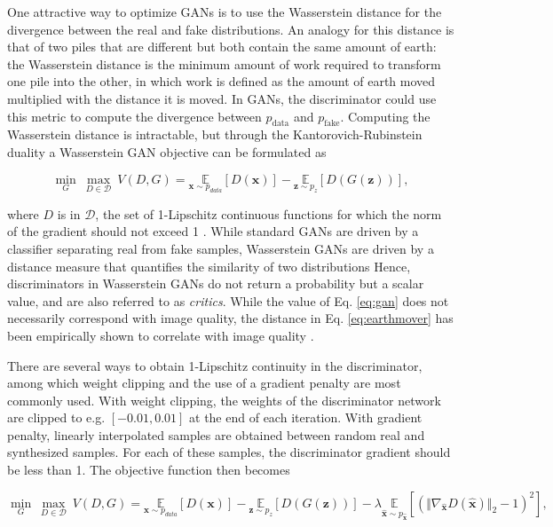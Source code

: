 \documentclass{article}
\begin{document}
One attractive way to optimize GANs is to use the Wasserstein distance for the divergence between the real and fake distributions. An analogy for this distance is that of two piles that are different but both contain the same amount of earth: the Wasserstein distance is the minimum amount of work required to transform one pile into the other, in which work is defined as the amount of earth moved multiplied with the distance it is moved. In GANs, the discriminator could use this metric to compute the divergence between $p_{\text{data}}$ and $p_{\text{fake}}$. Computing the Wasserstein distance is intractable, but through the Kantorovich-Rubinstein duality a Wasserstein GAN objective can be formulated \cite{Arjo17} as

\begin{equation}
\underset{G}{\min}~\underset{D \in \mathcal{D}}{\max}~ V(D,G)=\underset{\mathbf{x}\sim p_{data}}{\mathds{E}} [D(\mathbf{x})]-\underset{\mathbf{z}\sim p_z}{\mathds{E}} [D(G(\mathbf{z}))],
\label{eq:earthmover}
\end{equation}

where $D$ is in $\mathcal{D}$, the set of 1-Lipschitz continuous functions for which the norm of the gradient should not exceed 1 \cite{Arjo17}. While standard GANs are driven by a classifier separating real from fake samples, Wasserstein GANs are driven by a distance measure that quantifies the similarity of two distributions Hence, discriminators in Wasserstein GANs do not return a probability but a scalar value, and are also referred to as \textit{critics}.  While the value of Eq. \ref{eq:gan} does not necessarily correspond with image quality, the distance in Eq. \ref{eq:earthmover} has been empirically shown to correlate with image quality \cite{Arjo17}.

There are several ways to obtain 1-Lipschitz continuity in the discriminator, among which weight clipping \cite{Arjo17} and the use of a gradient penalty \cite{Gulj17} are most commonly used. 
With weight clipping, the weights of the discriminator network are clipped to e.g. $[-0.01,0.01]$ at the end of each iteration. With gradient penalty, linearly interpolated samples are obtained between random real and synthesized samples. For each of these samples, the discriminator gradient should be less than 1. The objective function then becomes

\begin{equation}
\underset{G}{\min}~\underset{D \in \mathcal{D}}{\max}~ V(D,G)=\underset{\mathbf{x}\sim p_{data}}{\mathds{E}} [D(\mathbf{x})]-\underset{\mathbf{z}\sim p_z}{\mathds{E}} [D(G(\mathbf{z}))] - \lambda \underset{\hat{\mathbf{x}}\sim p_{\hat{\mathbf{x}}}}{\mathds{E}} [(\Vert \nabla_{\hat{\mathbf{x}}}D(\hat{\mathbf{x}})\Vert _2 - 1)^2],
\label{eq:gradientpenalty}
\end{equation}
\end{document}
